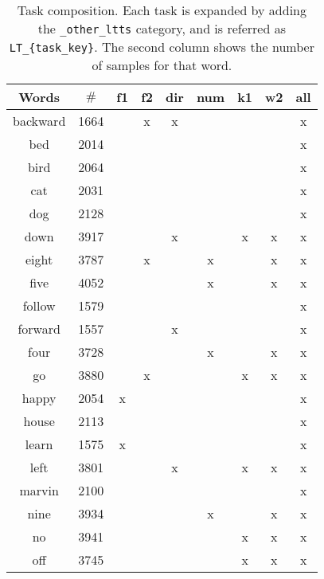 \begin{table}[h!]
    \centering
    \caption{Task composition.
    Each task is expanded by adding the
    \texttt{\_other\_ltts}
    category,
    and is referred as
    \texttt{LT\_\{task\_key\}}.
    The second column shows the number of samples for that word.
    }
    \label{tab:task_word_composition}
    \begin{tabular}{|c|c|ccccccc|}
        \hline
        Words & $\#$          &f1 &f2 &dir&num&k1 &w2 &all \\
        \hline
        backward & 1664       &   & x & x &   &   &   & x  \\
        bed & 2014            &   &   &   &   &   &   & x  \\
        bird & 2064           &   &   &   &   &   &   & x  \\
        cat & 2031            &   &   &   &   &   &   & x  \\
        \hline
        dog & 2128            &   &   &   &   &   &   & x  \\
        down & 3917           &   &   & x &   & x & x & x  \\
        eight & 3787          &   & x &   & x &   & x & x  \\
        five & 4052           &   &   &   & x &   & x & x  \\
        \hline
        follow & 1579         &   &   &   &   &   &   & x  \\
        forward & 1557        &   &   & x &   &   &   & x  \\
        four & 3728           &   &   &   & x &   & x & x  \\
        go & 3880             &   & x &   &   & x & x & x  \\
        \hline
        happy & 2054          & x &   &   &   &   &   & x  \\
        house & 2113          &   &   &   &   &   &   & x  \\
        learn & 1575          & x &   &   &   &   &   & x  \\
        left & 3801           &   &   & x &   & x & x & x  \\
        \hline
        marvin & 2100         &   &   &   &   &   &   & x  \\
        nine & 3934           &   &   &   & x &   & x & x  \\
        no & 3941             &   &   &   &   & x & x & x  \\
        off & 3745            &   &   &   &   & x & x & x  \\

\end{tabular}
\end{table}
